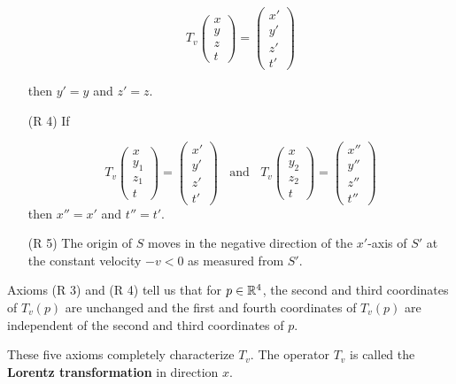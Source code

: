 \begin{definition}
\begin{enumerate}
			\[T_v\begin{pmatrix}
					x \\ y \\ z \\ t
				\end{pmatrix} = \begin{pmatrix}
					x' \\ y' \\ z' \\ t'
				\end{pmatrix}\]

			then $y' = y$ and $z' = z$.
		\item[(R 4)] If

			\[T_v\begin{pmatrix}
					x \\ y_1 \\ z_1 \\ t
				\end{pmatrix} = \begin{pmatrix}
					x' \\ y' \\ z' \\ t'
				\end{pmatrix}\ \ \ \ \text{and}\ \ \ \ T_v\begin{pmatrix}
					x \\ y_2 \\ z_2 \\ t
				\end{pmatrix} = \begin{pmatrix}
					x'' \\ y'' \\ z'' \\ t''
				\end{pmatrix}\]
			then $x'' = x'$ and $t'' = t'$.
		\item[(R 5)] The origin of $S$ moves in the negative direction of the $x'$-axis of $S'$ at the constant velocity $-v < 0$ as measured from $S'$.
	\end{enumerate}

	Axioms (R 3) and (R 4) tell us that for $p \in \mathbb{R}^4$, the second and third coordinates of $T_v(p)$ are unchanged and the first and fourth coordinates of $T_v(p)$ are independent of the second and third coordinates of $p$.

	These five axioms completely characterize $T_v$. The operator $T_v$ is called the \textbf{Lorentz transformation} in direction $x$.
\end{definition}

